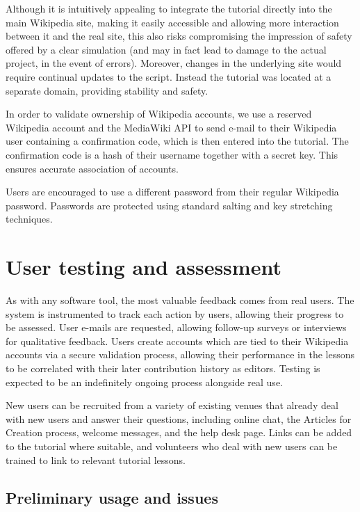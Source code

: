 \documentclass{acm_proc_article-sp}
\begin{document}
Although it is intuitively appealing to integrate the tutorial directly into the main Wikipedia site, making it easily accessible and allowing more interaction between it and the real site, this also risks compromising the impression of safety offered by a clear simulation (and may in fact lead to damage to the actual project, in the event of errors). Moreover, changes in the underlying site would require continual updates to the script. Instead the tutorial was located at a separate domain, providing stability and safety.

In order to validate ownership of Wikipedia accounts, we use a reserved Wikipedia account and the MediaWiki API to send e-mail to their Wikipedia user containing a confirmation code, which is then entered into the tutorial. The confirmation code is a hash of their username together with a secret key. This ensures accurate association of accounts.

Users are encouraged to use a different password from their regular Wikipedia password. Passwords are protected using standard salting and key stretching techniques.

\section{User testing and assessment}

As with any software tool, the most valuable feedback comes from real users. The system is instrumented to track each action by users, allowing their progress to be assessed. User e-mails are requested, allowing follow-up surveys or interviews for qualitative feedback. Users create accounts which are tied to their Wikipedia accounts via a secure validation process, allowing their performance in the lessons to be correlated with their later contribution history as editors. Testing is expected to be an indefinitely ongoing process alongside real use.

New users can be recruited from a variety of existing venues that already deal with new users and answer their questions, including online chat, the Articles for Creation process, welcome messages, and the help desk page. Links can be added to the tutorial where suitable, and volunteers who deal with new users can be trained to link to relevant tutorial lessons.

\subsection{Preliminary usage and issues}
\end{document}
